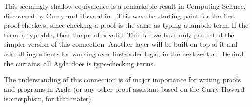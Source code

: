This seemingly shallow equivalence is a remarkable result in Computing Science, discovered
by Curry and Howard in \cite{Curry01,Howard01}. This was the starting point for the
first proof checkers, since checking a proof is the same as typing a lambda-term. If the
term is typeable, then the proof is valid. This far we have only presented the simpler
version of this connection. Another layer will be built on top of it and add all ingredients
for working over first-order logic, in the next section. Behind the curtains,
all Agda does is type-checking terms.

The understanding of this connection is of major importance for writing proofs and programs in
Agda (or any other proof-assistant based on the Curry-Howard isomorphism, for that mater).


